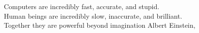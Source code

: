 \thispagestyle{empty}
\begin{flushright}

\vspace*{60mm}

Computers are incredibly fast, accurate, and stupid.\\
Human beings are incredibly slow, inaccurate, and brilliant.\\
Together they are powerful beyond imagination
\vspace{4mm}
Albert Einstein, \textit{}\\

\end{flushright}